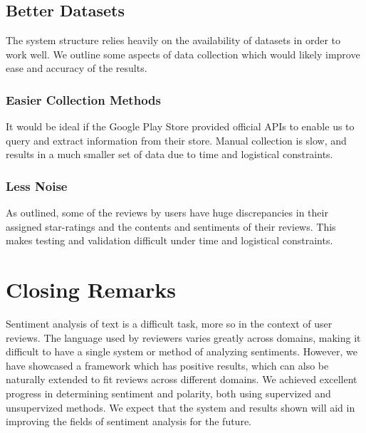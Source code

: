 \documentclass[11pt]{report} %
\begin{document}
\subsection{Better Datasets}
The system structure relies heavily on the availability of datasets in order to work well. We outline some aspects of data collection which would likely improve ease and accuracy of the results.

\subsubsection{Easier Collection Methods}
It would be ideal if the Google Play Store provided official APIs to enable us to query and extract information from their store. Manual collection is slow, and results in a much smaller set of data due to time and logistical constraints. 

\subsubsection{Less Noise}
As outlined, some of the reviews by users have huge discrepancies in their assigned star-ratings and the contents and sentiments of their reviews. This makes testing and validation difficult under time and logistical constraints. 

\section{Closing Remarks}
Sentiment analysis of text is a difficult task, more so in the context of user reviews. The language used by reviewers varies greatly across domains, making it difficult to have a single system or method of analyzing sentiments. However, we have showcased a framework which has positive results, which can also be naturally extended to fit reviews across different domains. We achieved excellent progress in determining sentiment and polarity, both using supervized and unsupervized methods. We expect that the system and results shown will aid in improving the fields of sentiment analysis for the future.

%


\end{document}
